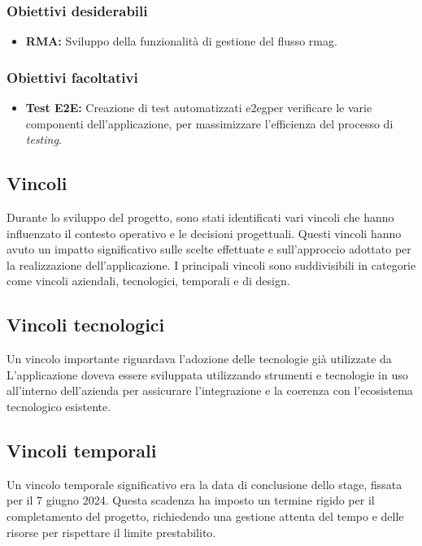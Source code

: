 \subsubsection*{Obiettivi desiderabili}
\begin{itemize}
    \item \textbf{RMA:} Sviluppo della funzionalità di gestione del flusso \gls{rmag}\glox\gloxspacing.
\end{itemize}

\subsubsection*{Obiettivi facoltativi}
\begin{itemize}
    \item \textbf{Test E2E:} Creazione di test automatizzati \gls{e2eg}\glox\gloxspacing per verificare le varie componenti dell'applicazione, per massimizzare l'efficienza del processo di \textit{testing}.
\end{itemize}

\subsection{Vincoli}

Durante lo sviluppo del progetto, sono stati identificati vari vincoli che hanno influenzato il contesto operativo e le decisioni progettuali. 
Questi vincoli hanno avuto un impatto significativo sulle scelte effettuate e sull'approccio adottato per la realizzazione dell'applicazione. 
I principali vincoli sono suddivisibili in categorie come vincoli aziendali, tecnologici, temporali e di design.
\subsection*{Vincoli tecnologici}
Un vincolo importante riguardava l'adozione delle tecnologie già utilizzate da \myAzienda
L'applicazione doveva essere sviluppata utilizzando strumenti e tecnologie in uso all'interno dell'azienda per assicurare l'integrazione e la coerenza con l'ecosistema tecnologico esistente.
\subsection*{Vincoli temporali}
Un vincolo temporale significativo era la data di conclusione dello stage, fissata per il 7 giugno 2024.
Questa scadenza ha imposto un termine rigido per il completamento del progetto, richiedendo una gestione attenta del tempo e delle risorse per rispettare il limite prestabilito.
